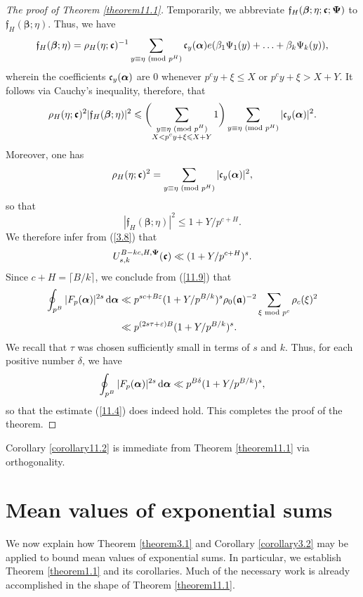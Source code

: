 \documentclass[12pt,reqno]{amsart}
\theoremstyle{definition}
\theoremstyle{remark}
\numberwithin{equation}{section}
\newcommand{\mmod}[1]{\,\,(\text{\rm mod}\,\,#1)}
\newcommand{\nmod}[1]{\,\,\text{\rm mod}\,\,#1}
\def\grc{{\mathfrak c}}\def\grC{{\mathfrak C}}\def\bfgrc{{\boldsymbol \grc}}
\def\grf{{\mathfrak f}}\def\grF{{\mathfrak F}}
\def\bet{{\beta}}  \def\bfbet{{\boldsymbol \beta}}
\def\del{{\delta}} \def\Del{{\Delta}} \def\Deltil{{\widetilde \Delta}}
\def\eps{\varepsilon}
\def\le{\leqslant} \def\ge{\geqslant} \def\pleq{\preccurlyeq} \def\ple{\prec}
\def\d{{\,{\rm d}}}
\begin{document}
\begin{proof}[The proof of Theorem \ref{theorem11.1}]
\par Temporarily, we abbreviate $\grf_H(\bfbet;\eta;\bfgrc;\bfPsi)$ 
to $\grf_H(\bfbet;\eta)$. Thus, we have
$$\grf_H(\bfbet;\eta)=\rho_H(\eta;\bfgrc)^{-1}\sum_{y\equiv \eta\mmod{p^H}}
\grc_y(\bfalp)e(\bet_1\Psi_1(y)+\ldots +\bet_k\Psi_k(y)),$$
wherein the coefficients $\grc_y(\bfalp)$ are $0$ whenever $p^cy+\xi\le X$ or 
$p^cy+\xi>X+Y$. It follows via Cauchy's inequality, therefore, that
$$\rho_H(\eta;\bfgrc)^2|\grf_H(\bfbet;\eta)|^2\le \biggl( 
\sum_{\substack{y\equiv \eta \mmod{p^H}\\ X<p^cy+\xi\le X+Y}}1\biggr) 
\sum_{y\equiv \eta\mmod{p^H}}|\grc_y(\bfalp)|^2.$$
Moreover, one has
$$\rho_H(\eta;\bfgrc)^2=\sum_{y\equiv \eta\mmod{p^H}}|\grc_y(\bfalp)|^2,$$
so that
$$|\grf_H(\bfbet;\eta)|^2\le 1+Y/p^{c+H}.$$
We therefore infer from (\ref{3.8}) that
$$U_{s,k}^{B-kc,H,\bfPsi}(\bfgrc)\ll (1+Y/p^{c+H})^s.$$
Since $c+H=\lceil B/k\rceil$, we conclude from (\ref{11.9}) that
\begin{align*}
\oint_{p^B}|F_p(\bfalp)|^{2s}\d\bfalp &\ll p^{sc+B\eps}(1+Y/p^{B/k})^s
\rho_0(\bfgra)^{-2}\sum_{\xi\nmod{p^c}}\rho_c(\xi)^2\\
&\ll p^{(2s\tau+\eps)B}(1+Y/p^{B/k})^s.
\end{align*}
We recall that $\tau$ was chosen sufficiently small in terms of $s$ and $k$. Thus, for each 
positive number $\del$, we have
$$\oint_{p^B}|F_p(\bfalp)|^{2s}\d\bfalp \ll p^{B\del}(1+Y/p^{B/k})^s,$$
so that the estimate (\ref{11.4}) does indeed hold. This completes the proof of the 
theorem.
\end{proof}

Corollary \ref{corollary11.2} is immediate from Theorem \ref{theorem11.1} via 
orthogonality.

\section{Mean values of exponential sums} We now explain how Theorem \ref{theorem3.1}
 and Corollary \ref{corollary3.2} may be applied to bound mean values of exponential sums. 
In particular, we establish Theorem \ref{theorem1.1} and its corollaries. Much of the 
necessary work is already accomplished in the shape of Theorem \ref{theorem11.1}.
\end{document}
